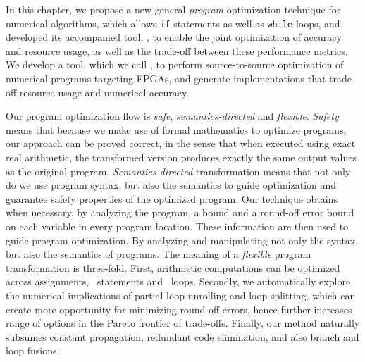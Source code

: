 
In this chapter, we propose a new general \emph{program} optimization technique
for numerical algorithms, which allows \texttt{if} statements as well as
\texttt{while} loops, and developed its accompanied tool, \newsoap, to enable
the joint optimization of accuracy and resource usage, as well as the trade-off
between these performance metrics.  We develop a tool, which we call \newsoap,
to perform source-to-source optimization of numerical programs targeting FPGAs,
and generate implementations that trade off resource usage and numerical
accuracy.

Our program optimization flow is \emph{safe}, \emph{semantics-directed} and
\emph{flexible}. \emph{Safety} means that because we make use of formal
mathematics to optimize programs, our approach can be proved correct, in
the sense that when executed using exact real arithmetic, the transformed
version produces exactly the same output values as the original program.
\emph{Semantics-directed} transformation means that not only do we use
program syntax, but also the semantics to guide optimization and guarantee
safety properties of the optimized program.  Our technique obtains when
necessary, by analyzing the program, a bound and a round-off error bound on
each variable in every program location.  These information are then used
to guide program optimization.  By analyzing and manipulating not only the
syntax, but also the semantics of programs.  The meaning of a \emph{flexible}
program transformation is three-fold.  First, arithmetic computations can be
optimized across assignments, \iflit~statements and \whilelit~loops.  Secondly,
we automatically explore the numerical implications of partial loop unrolling
and loop splitting, which can create more opportunity for minimizing round-off
errors, hence further increases range of options in the Pareto frontier of
trade-offs.  Finally, our method naturally subsumes constant propagation,
redundant code elimination, and also branch and loop fusions.


